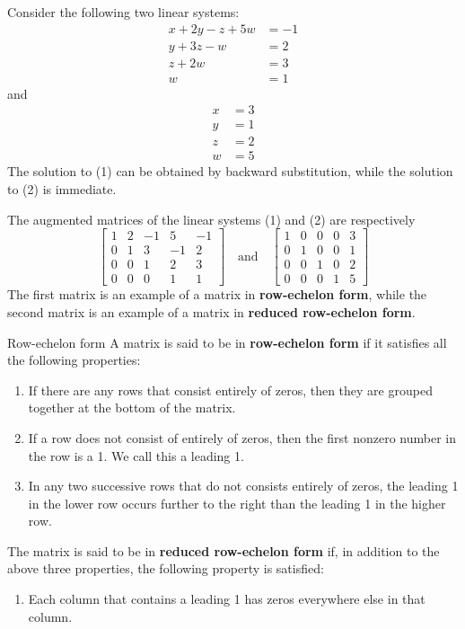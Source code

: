 Consider the following two linear systems:
\begin{equation*}\tag{1}
\begin{split}
x + 2y - z + 5w &= -1 \\
y + 3z - w &= 2 \\
z + 2w &= 3 \\
w &= 1
\end{split}
\end{equation*}
and
\begin{equation*}\tag{2}
\begin{split}
x &= 3 \\
y &= 1 \\
z &= 2 \\
w &= 5
\end{split}
\end{equation*}
The solution to (1) can be obtained by backward substitution, while the solution to (2) is immediate.

The augmented matrices of the linear systems (1) and (2) are respectively
\[ \begin{bmatrix}
    1 & 2 & -1 & 5 & -1 \\
    0 & 1 & 3 & -1 & 2 \\
    0 & 0 & 1 & 2 & 3 \\
    0 & 0 & 0 & 1 & 1
\end{bmatrix} \quad \text{and} \quad
\begin{bmatrix}
    1 & 0 & 0 & 0 & 3 \\
    0 & 1 & 0 & 0 & 1 \\
    0 & 0 & 1 & 0 & 2 \\
    0 & 0 & 0 & 1 & 5
\end{bmatrix} \]
The first matrix is an example of a matrix in \textbf{row-echelon form}, while the second matrix is an example of a matrix in \textbf{reduced row-echelon form}.

\begin{defn}{Row-echelon form}{}
A matrix is said to be in \textbf{row-echelon form} if it satisfies all the following properties:
\begin{enumerate}
\item If there are any rows that consist entirely of zeros, then they are grouped together at the bottom of the matrix.
\item If a row does not consist of entirely of zeros, then the first nonzero number in the row is a 1. We call this a leading 1.
\item In any two successive rows that do not consists entirely of zeros, the leading 1 in the lower row occurs further to the right than the leading 1 in the higher row.
\end{enumerate}
The matrix is said to be in \textbf{reduced row-echelon form} if, in addition to the above three properties, the following property is satisfied:
\begin{enumerate}[resume]
\item Each column that contains a leading 1 has zeros everywhere else in that column.
\end{enumerate}
\end{defn}

